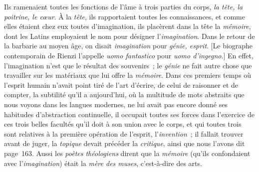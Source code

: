 \documentclass[french,twoside]{book} %
\begin{document}
Ils ramenaient toutes les fonctions de l’âme à trois parties du corps, {\itshape la tête, la poitrine, le cœur}. À la {\itshape tête}, ils rapportaient toutes les connaissances, et comme elles étaient chez eux toutes d’imagination, ils placèrent dans la tête la {\itshape mémoire}, dont les Latins employaient le nom pour désigner l’{\itshape imagination}. Dans le retour de la barbarie au moyen âge, on disait {\itshape imagination} pour {\itshape génie, esprit}. [Le biographe contemporain de Rienzi l’appelle \emph{{\itshape uomo fantastico}} pour {\itshape uomo d’ingegno}.] En effet, l’imagination n’est que le résultat des souvenirs ; le {\itshape génie} ne fait autre chose que travailler sur les matériaux que lui offre la {\itshape mémoire}. Dans ces premiers temps où l’esprit humain n’avait point tiré de l’art d’écrire, de celui de raisonner et de compter, la subtilité qu’il a aujourd’hui, où la multitude de mots abstraits que nous voyons dans les langues modernes, ne lui avait pas encore donné ses habitudes d’abstraction continuelle, il occupait toutes ses forces dans l’exercice de ces trois belles facultés qu’il doit à son union avec le corps, et qui toutes trois sont relatives à la première opération de l’esprit, l’{\itshape invention} ; il fallait trouver avant de juger, la {\itshape topique} devait précéder  la {\itshape critique}, ainsi que nous l’avons dit page 163. Aussi les {\itshape poètes théologiens} dirent que la {\itshape mémoire} (qu’ils confondaient avec l’{\itshape imagination}) était la {\itshape mère des muses}, c’est-à-dire des arts.\par
\end{document}
